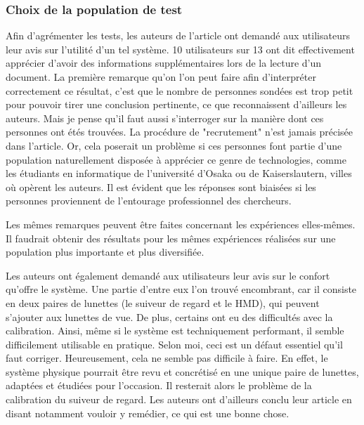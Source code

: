 \documentclass[a4paper]{article}
\begin{document}
\subsubsection{Choix de la population de test}
Afin d'agrémenter les tests, les auteurs de l'article ont demandé aux utilisateurs leur avis sur l'utilité d'un tel système. 10 utilisateurs sur 13 ont dit effectivement apprécier d'avoir des informations supplémentaires lors de la lecture d'un document. La première remarque qu'on l'on peut faire afin d'interpréter correctement ce résultat, c'est que le nombre de personnes sondées est trop petit pour pouvoir tirer une conclusion pertinente, ce que reconnaissent d'ailleurs les auteurs. Mais je pense qu'il faut aussi s'interroger sur la manière dont ces personnes ont étés trouvées. La procédure de "recrutement" n'est jamais précisée dans l'article. Or, cela poserait un problème si ces personnes font partie d'une population naturellement disposée à apprécier ce genre de technologies, comme les étudiants en informatique de l'université d'Osaka ou de Kaiserslautern, villes où opèrent les auteurs. Il est évident que les réponses sont biaisées si les personnes proviennent de l'entourage professionnel des chercheurs.

Les mêmes remarques peuvent être faites concernant les expériences elles-mêmes. Il faudrait obtenir des résultats pour les mêmes expériences réalisées sur une population plus importante et plus diversifiée.

Les auteurs ont également demandé aux utilisateurs leur avis sur le confort qu'offre le système. Une partie d'entre eux l'on trouvé encombrant, car il consiste en deux paires de lunettes (le suiveur de regard et le HMD), qui peuvent s'ajouter aux lunettes de vue. De plus, certains ont eu des difficultés avec la calibration. Ainsi, même si le système est techniquement performant, il semble difficilement utilisable en pratique. Selon moi, ceci est un défaut essentiel qu'il faut corriger. Heureusement, cela ne semble pas difficile à faire. En effet, le système physique pourrait être revu et concrétisé en une unique paire de lunettes, adaptées et étudiées pour l'occasion. Il resterait alors le problème de la calibration du suiveur de regard. Les auteurs ont d'ailleurs conclu leur article en disant notamment vouloir y remédier, ce qui est une bonne chose.
\end{document}
